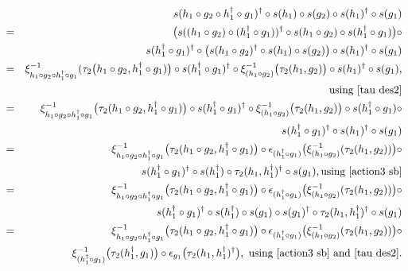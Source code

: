 \documentclass{jonasart}
\theoremstyle{plain}
\begin{document}
	\begin{eqnarray}
		&& s(h_1\circ g_2\circ h_1^\dagger\circ g_1 )^\dagger\circ s(h_1 )\circ s(g_2 )\circ s(h_1 )^\dagger\circ s(g_1 ) \nonumber\\
		&=&\big(s((h_1\circ g_2 )\circ (h_1^\dagger\circ g_1 ))^\dagger\circ s(h_1\circ g_2 )\circ s(h_1^\dagger\circ g_1 )\big)\circ\nonumber\\
		&& s(h_1^\dagger\circ g_1 )^\dagger\circ \big(s(h_1\circ g_2 )^\dagger\circ s(h_1 )\circ s(g_2 )\big)\circ s(h_1 )^\dagger\circ s(g_1 )\nonumber\\
		&=&\xi^{-1}_{h_1\circ g_2\circ h_1^\dagger\circ g_1}(\tau_2 \big(h_1\circ g_2,h_1^\dagger \circ g_1 ) \big)\circ s(h_1^\dagger\circ g_1 )^\dagger\circ \xi^{-1}_{(h_1\circ g_2 )}\big(\tau_2 (h_1,g_2 )\big)\circ s(h_1 )^\dagger\circ s(g_1 ), \nonumber\\
		&&\text{using \eqref{tau des2}}\nonumber\\
		&=&\xi^{-1}_{h_1\circ g_2\circ h_1^\dagger\circ g_1} \big(\tau_2 (h_1\circ g_2,h_1^\dagger \circ g_1 )\big)\circ s(h_1^\dagger\circ g_1 )^\dagger\circ\xi^{-1}_{(h_1\circ g_2 )}\big(\tau_2 (h_1,g_2 )\big)\circ s(h_1^\dagger\circ g_1 ) \circ \nonumber\\
		&&s(h_1^\dagger\circ g_1 )^\dagger\circ s(h_1 )^\dagger\circ s(g_1 )\nonumber\\
		&=&\xi^{-1}_{h_1\circ g_2\circ h_1^\dagger\circ g_1} \big(\tau_2 (h_1\circ g_2,h_1^\dagger \circ g_1 )\big)\circ \epsilon_{(h_1^\dagger\circ g_1 )} \big(\xi^{-1}_{(h_1\circ g_2 )}(\tau_2 (h_1,g_2 )) \big)\circ\nonumber\\
		&&s(h_1^\dagger\circ g_1 )^\dagger\circ s(h_1^\dagger)\circ \tau_2 (h_1,h_1^\dagger)^\dagger\circ s(g_1 ), \text{using~\eqref{action3 sb}}\nonumber \\
		&=&\xi^{-1}_{h_1\circ g_2\circ h_1^\dagger\circ g_1} \big(\tau_2 (h_1\circ g_2,h_1^\dagger \circ g_1 )\big)\circ \epsilon_{(h_1^\dagger\circ g_1 )}\big(\xi^{-1}_{(h_1\circ g_2 )}(\tau_2 (h_1,g_2 ))\big)\circ\nonumber\\
		&&s(h_1^\dagger\circ g_1 )^\dagger\circ s(h_1^\dagger)\circ s(g_1 )\circ s(g_1 )^\dagger\circ \tau_2 (h_1,h_1^\dagger)^\dagger\circ s(g_1 )\nonumber\\
		&=&\xi^{-1}_{h_1\circ g_2\circ h_1^\dagger\circ g_1}\big(\tau_2 (h_1\circ g_2,h_1^\dagger \circ g_1 )\big)\circ \epsilon_{(h_1^\dagger\circ g_1 )}\big(\xi^{-1}_{(h_1\circ g_2 )}(\tau_2 (h_1,g_2 ))\big)\circ\nonumber\\
		&&\xi^{-1}_{(h_1^\dagger\circ g_1 )}\big(\tau_2 (h_1^\dagger,g_1 )\big)\circ\epsilon_{g_1} \big(\tau_2 (h_1,h_1^\dagger)^\dagger\big),~\text{using~\eqref{action3 sb} and~\eqref{tau des2}.} \label{tilde tau1}
	\end{eqnarray}
\end{document}
